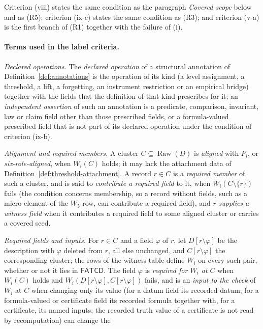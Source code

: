 \documentclass[11pt]{article}
\theoremstyle{definition}
\newcommand{\FATCD}{\ensuremath{\mathsf{FATCD}}}
\newcommand{\Raw}[1]{\ensuremath{\operatorname{Raw}\!\left(#1\right)}}
\begin{document}
Criterion (viii) states the same condition as the paragraph \emph{Covered scope} below and as (R5); criterion (ix-c) states the same condition as (R3); and criterion (v-a) is the first branch of (R1) together with the failure of (i).

\paragraph{Terms used in the label criteria.}
\emph{Declared operations.} The \emph{declared operation} of a structural annotation of
Definition~\ref{def:annotations} is the operation of its kind (a level
assignment, a threshold, a lift, a forgetting, an instrument restriction or an
empirical bridge) together with the fields that the definition of that kind
prescribes for it; an \emph{independent assertion} of such an annotation is a
predicate, comparison, invariant, law or claim field other than those
prescribed fields, or a formula-valued prescribed field that is not part of
its declared operation under the condition of criterion (ix-b).
\par\smallskip\noindent\emph{Alignment and required members.} A cluster \(C\subseteq\Raw{D}\) is \emph{aligned} with \(P_i\), or
\emph{six-role-aligned}, when \(W_i(C)\) holds; it may lack the attachment
data of Definition~\ref{def:threshold-attachment}. A record \(r\in C\) is a \emph{required member} of such a cluster, and is said
to \emph{contribute a required field} to it, when
\(W_i(C\setminus\{r\})\) fails (the condition concerns membership, so a record
without fields, such as a micro-element of the \(W_5\) row, can contribute a
required field), and \(r\) \emph{supplies a witness field}
when it contributes a required field to some aligned cluster or carries a
covered seed. \par\noindent\emph{Required fields and inputs.} For \(r\in C\) and a field \(\varphi\) of \(r\), let \(D[r\setminus\varphi]\) be
the description with \(\varphi\) deleted from \(r\), all else unchanged, and
\(C[r\setminus\varphi]\) the corresponding cluster; the rows of the witness table
define \(W_i\) on every such pair, whether or not it lies in \FATCD{}. The field
\(\varphi\) is \emph{required for \(W_i\) at \(C\)} when \(W_i(C)\) holds and
\(W_i(D[r\setminus\varphi],C[r\setminus\varphi])\) fails, and is an \emph{input to
the check} of \(W_i\) at \(C\) when changing only its value (for a datum
field its recorded datum; for a formula-valued or certificate field its
recorded formula together with, for a certificate, its named inputs; the
recorded truth value of a certificate is not read by recomputation) can change the
\end{document}
